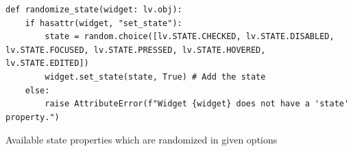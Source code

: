 \documentclass[Bachelor, BIC, english, fhCitStyle, IEEE]{BASE/twbook} %
\begin{document}
\begin{listing}[htbp]
    \begin{verbatim}
def randomize_state(widget: lv.obj):
    if hasattr(widget, "set_state"):
        state = random.choice([lv.STATE.CHECKED, lv.STATE.DISABLED, lv.STATE.FOCUSED, lv.STATE.PRESSED, lv.STATE.HOVERED, lv.STATE.EDITED])
        widget.set_state(state, True) # Add the state
    else:
        raise AttributeError(f"Widget {widget} does not have a 'state' property.")
    \end{verbatim}
    \caption{Available state properties which are randomized in given options}
    \label{code:randomized-state}
\end{listing}
\clearpage
\end{document}
